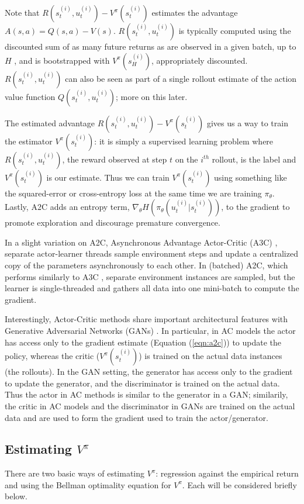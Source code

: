 \documentclass[11pt, oneside]{article}					%
\begin{document}
\bigskip
\noindent
Note that $R(s^{(i)}_t, u^{(i)}_t) - V^{\pi}(s^{(i)}_t)$
estimates the advantage $A(s, a) = Q(s, a) - V (s)$.
$R(s^{(i)}_t, u^{(i)}_t)$ is typically computed using the
discounted sum of as many future returns as are observed in a
given batch, up to $H$ , and is bootstrapped with
$V^{\pi}(s^{(i)}_H)$, appropriately discounted. $R(s^{(i)}_t,
u^{(i)}_t)$ can also be seen as part of a single rollout estimate
of the action value function $Q(s^{(i)}_t, u^{(i)}_t)$; more on
this later.

\bigskip
\noindent
The estimated advantage $R(s^{(i)}_t, u^{(i)}_t) -
V^{\pi}(s^{(i)}_t)$ gives us a way to train the estimator
$V^{\pi}(s^{(i)}_t)$: it is simply a supervised learning problem
where $R(s^{(i)}_t, u^{(i)}_t)$, the reward observed at step $t$
on the $i^{th}$ rollout, is the label and $V^{\pi}(s^{(i)}_t)$ is
our estimate. Thus we can train $V^{\pi}(s^{(i)}_t)$ using
something like the squared-error or cross-entropy loss at the
same time we are training $\pi_{\theta}$. Lastly, A2C adds an
entropy term, $\nabla_{\theta} H(\pi_{\theta} (u^{(i)}_t |
s^{(i)}_t))$, to the gradient to promote exploration and
discourage premature convergence.

\bigskip
\noindent
In a slight variation on A2C, Asynchronous Advantage Actor-Critic
(A3C) \cite{2016arXiv160201783M}, separate actor-learner threads
sample environment steps and update a centralized copy of the
parameters asynchronously to each other. In (batched) A2C, which
performs similarly to A3C \cite{2017arXiv170706347S}, separate
environment instances are sampled, but the learner is
single-threaded and gathers all data into one mini-batch to
compute the gradient.

\bigskip
\noindent
Interestingly, Actor-Critic methods share important architectural
features with Generative Adversarial Networks (GANs)
\cite{2016arXiv160201783M}. In particular, in AC models the actor
has access only to the gradient estimate (Equation (\ref{eqn:a2c}))
to update the policy, whereas the critic ($ V^{\pi}(s^{(i)}_t)$)
is trained on the actual data instances (the rollouts).  In the
GAN setting, the generator has access only to the gradient to
update the generator, and the discriminator is trained on the
actual data. Thus the actor in AC methods is similar to the
generator in a GAN; similarily, the critic in AC models and the
discriminator in GANs are trained on the actual data and are used
to form the gradient used to train the actor/generator.

\subsection{Estimating $V^{\pi}$}
\label{seq:estimating_v}
There are two basic ways of estimating $V^{\pi}$: regression
against the empirical return and using the Bellman optimality
equation for $V^{\pi}$. Each will be considered briefly below.
\end{document}
